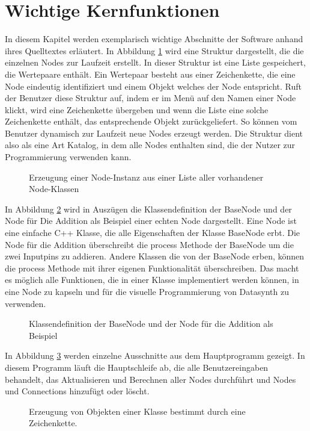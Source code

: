 \documentclass[a4paper, 12pt, DIVcalc, onepage, pdftex, headsepline, footsepline]{scrreprt}
\begin{document}
\section{Wichtige Kernfunktionen}
\label{sec:Kernfunktionen}
In diesem Kapitel werden exemplarisch wichtige Abschnitte der Software anhand ihres Quelltextes
erläutert.
In Abbildung \ref{fig:factory} wird eine Struktur dargestellt, die die einzelnen
Nodes zur Laufzeit erstellt. In dieser Struktur ist eine Liste gespeichert, die Wertepaare
enthält. Ein Wertepaar besteht aus einer Zeichenkette, die eine Node eindeutig identifiziert
und einem Objekt welches der Node entspricht. Ruft der Benutzer diese Struktur auf, indem
er im Menü auf den Namen einer Node klickt, wird
eine Zeichenkette übergeben und wenn die Liste eine solche Zeichenkette enthält, das
entsprechende Objekt zurückgeliefert. So können vom Benutzer dynamisch zur Laufzeit
neue Nodes erzeugt werden. Die Struktur dient also als eine Art Katalog, in dem alle
Nodes enthalten sind, die der Nutzer zur Programmierung verwenden kann.
\begin{figure}
\centering

\caption{Erzeugung einer Node-Instanz aus einer Liste aller vorhandener Node-Klassen}
\label{fig:factory}
\end{figure}

In Abbildung \ref{fig:node} wird in Auszügen die Klassendefinition der BaseNode und
der Node für Die Addition als Beispiel einer echten Node dargestellt.
Eine Node ist eine einfache C++ Klasse, die alle Eigenschaften der Klasse BaseNode erbt.
Die Node für die Addition überschreibt die process Methode der BaseNode um die zwei
Inputpins zu addieren. Andere Klassen die von der BaseNode erben, können die process
Methode mit ihrer eigenen Funktionalität überschreiben.
Das macht es möglich alle Funktionen,
die in einer Klasse implementiert werden können,
in eine Node zu kapseln und für die visuelle Programmierung von Datasynth zu verwenden.
\begin{figure}
\centering

\caption{Klassendefinition der BaseNode und der Node für die Addition als Beispiel}
\label{fig:node}
\end{figure}

In Abbildung \ref{fig:core} werden einzelne Ausschnitte aus dem Hauptprogramm gezeigt.
In diesem Programm läuft die Hauptschleife ab, die alle Benutzereingaben behandelt,
das Aktualisieren und Berechnen aller Nodes durchführt und Nodes und Connections
hinzufügt oder löscht.
\begin{figure}
\centering

\caption{Erzeugung von Objekten einer Klasse bestimmt durch eine Zeichenkette.}
\label{fig:core}
\end{figure}
\end{document}
